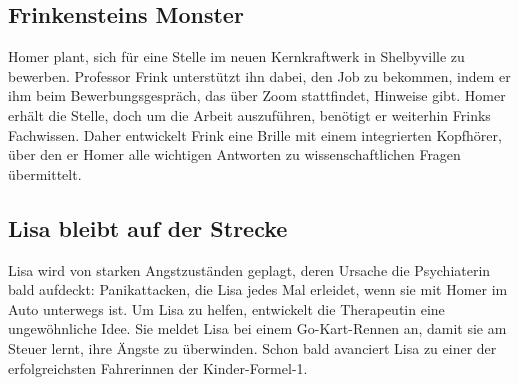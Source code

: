 
\subsection{Frinkensteins Monster}
Homer plant, sich für eine Stelle im neuen Kernkraftwerk in Shelbyville zu bewerben. Professor Frink unterstützt ihn dabei, den Job zu bekommen, indem er ihm beim Bewerbungsgespräch, das über Zoom stattfindet, Hinweise gibt. Homer erhält die Stelle, doch um die Arbeit auszuführen, benötigt er weiterhin Frinks Fachwissen. Daher entwickelt Frink eine Brille mit einem integrierten Kopfhörer, über den er Homer alle wichtigen Antworten zu wissenschaftlichen Fragen übermittelt.


\subsection{Lisa bleibt auf der Strecke}
Lisa wird von starken Angstzuständen geplagt, deren Ursache die Psychiaterin bald aufdeckt: Panikattacken, die Lisa jedes Mal erleidet, wenn sie mit Homer im Auto unterwegs ist. Um Lisa zu helfen, entwickelt die Therapeutin eine ungewöhnliche Idee. Sie meldet Lisa bei einem Go-Kart-Rennen an, damit sie am Steuer lernt, ihre Ängste zu überwinden. Schon bald avanciert Lisa zu einer der erfolgreichsten Fahrerinnen der Kinder-Formel-1.


